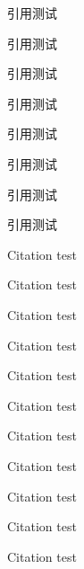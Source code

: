 \documentclass[degree=doctor,fontset=fandol]{ustcthesis}
\begin{document}
\START
\showoutput

引用\citet{yangzongying1996dianzi}测试\par
引用\citet[42]{yangzongying1996dianzi}测试\par
引用\citep{yangzongying1996dianzi}测试\par
引用\citep[42]{yangzongying1996dianzi}测试\par
引用\citep[见][]{yangzongying1996dianzi}测试\par
引用\citep[见][42]{yangzongying1996dianzi}测试\par
引用\citet*{yangzongying1996dianzi}测试\par
引用\citep*{yangzongying1996dianzi}测试\par

Citation \cite{baker1995future} test\par
Citation \cite{baker1995future} test\par
Citation \cite{baker1995future} test\par

Citation \citet{baker1995future} test\par
Citation \citet[42]{baker1995future} test\par
Citation \citep{baker1995future} test\par
Citation \citep[42]{baker1995future} test\par
Citation \citep[see][]{baker1995future} test\par
Citation \citep[see][42]{baker1995future} test\par
Citation \citet*{baker1995future} test\par
Citation \citep*{baker1995future} test\par

\nocite{*}

\backmatter
\printbibliography

\clearpage
\OMIT
\end{document}
